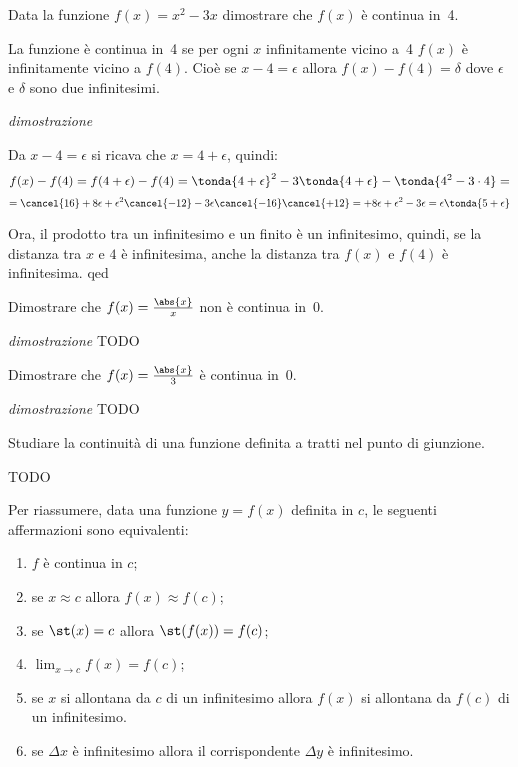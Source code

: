 \begin{esempio}
 Data la funzione \(f(x)=x^2-3x\) dimostrare che \(f(x)\) è continua in~4.
 
 La funzione è continua in~4 se per ogni \(x\) infinitamente vicino a~4 
 \(f(x)\) è infinitamente vicino a \(f(4)\). Cioè se \(x -4=\epsilon\) allora
 \(f(x) -f(4) = \delta\) dove \(\epsilon\) e \(\delta\) sono due infinitesimi.
 
\emph{dimostrazione}

Da \(x-4=\epsilon\) si ricava che \(x=4+\epsilon\), quindi: 
\[f(x) -f(4) = f(4+\epsilon) -f(4) = 
\tonda{4+\epsilon}^2-3\tonda{4+\epsilon}-\tonda{4^2-3\cdot 4}=\]
\[=\cancel{16}+8\epsilon+\epsilon^2\cancel{-12} 
  -3\epsilon\cancel{-16}\cancel{+12} = 
  +8\epsilon+\epsilon^2 -3\epsilon = 
\epsilon \tonda{5 + \epsilon}\]

Ora, il prodotto tra un infinitesimo e un finito è un infinitesimo, quindi, se 
la distanza tra \(x\) e \(4\) è infinitesima, anche la distanza tra 
\(f(x)\) e \(f(4)\) è infinitesima. qed 
 
\end{esempio}

\begin{esempio}
 Dimostrare che \(f(x)=\frac{\abs{x}}{x}\) non è continua in~0.
 
\emph{dimostrazione}
TODO
 
\end{esempio}

\begin{esempio}
 Dimostrare che \(f(x)=\frac{\abs{x}}{3}\) è continua in~0.
 
\emph{dimostrazione}
TODO
 
\end{esempio}

\begin{esempio}
 Studiare la continuità di una funzione definita a tratti nel punto di 
giunzione.
 
TODO
 
\end{esempio}

Per riassumere, data una funzione \(y=f(x)\) definita in \(c\), le seguenti 
affermazioni sono equivalenti:

\begin{enumerate}[noitemsep]
 \item \(f\) è continua in \(c\);
 \item se \(x \approx c\) allora \(f(x) \approx f(c)\);
 \item se \(\st(x) = c\) allora \(\st(f(x)) = f(c)\);
 \item \(\lim_{x \to c} f(x) = f(c)\);
 \item se \(x\) si allontana da \(c\) di un infinitesimo allora 
   \(f(x)\) si allontana da \(f(c)\) di un infinitesimo.
 \item se \(\Delta x\) è infinitesimo allora il corrispondente \(\Delta y\) 
   è infinitesimo.
\end{enumerate}


